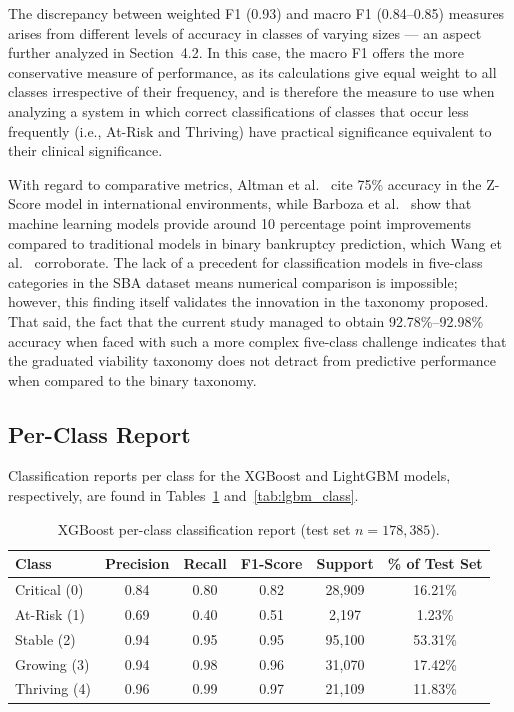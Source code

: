 The discrepancy between weighted F1 (0.93) and macro F1 (0.84--0.85) measures arises from different levels of accuracy in classes of varying sizes --- an aspect further analyzed in Section~4.2. In this case, the macro F1 offers the more conservative measure of performance, as its calculations give equal weight to all classes irrespective of their frequency, and is therefore the measure to use when analyzing a system in which correct classifications of classes that occur less frequently (i.e., At-Risk and Thriving) have practical significance equivalent to their clinical significance.

With regard to comparative metrics, Altman et al.~\cite{4} cite 75\% accuracy in the Z-Score model in international environments, while Barboza et al.~\cite{5} show that machine learning models provide around 10 percentage point improvements compared to traditional models in binary bankruptcy prediction, which Wang et al.~\cite{14} corroborate. The lack of a precedent for classification models in five-class categories in the SBA dataset means numerical comparison is impossible; however, this finding itself validates the innovation in the taxonomy proposed. That said, the fact that the current study managed to obtain 92.78\%--92.98\% accuracy when faced with such a more complex five-class challenge indicates that the graduated viability taxonomy does not detract from predictive performance when compared to the binary taxonomy.

\subsection{Per-Class Report}

Classification reports per class for the XGBoost and LightGBM models, respectively, are found in Tables~\ref{tab:xgb_class} and~\ref{tab:lgbm_class}.

\begin{table}[htbp]
\centering
\caption{XGBoost per-class classification report (test set $n = 178{,}385$).}
\label{tab:xgb_class}
\begin{tabular}{lccccc}
\hline
\textbf{Class} & \textbf{Precision} & \textbf{Recall} & \textbf{F1-Score} & \textbf{Support} & \textbf{\% of Test Set} \\
\hline
Critical (0) & 0.84 & 0.80 & 0.82 & 28,909 & 16.21\% \\
At-Risk (1) & 0.69 & 0.40 & 0.51 & 2,197 & 1.23\% \\
Stable (2) & 0.94 & 0.95 & 0.95 & 95,100 & 53.31\% \\
Growing (3) & 0.94 & 0.98 & 0.96 & 31,070 & 17.42\% \\
Thriving (4) & 0.96 & 0.99 & 0.97 & 21,109 & 11.83\% \\
\hline
\end{tabular}
\end{table}

